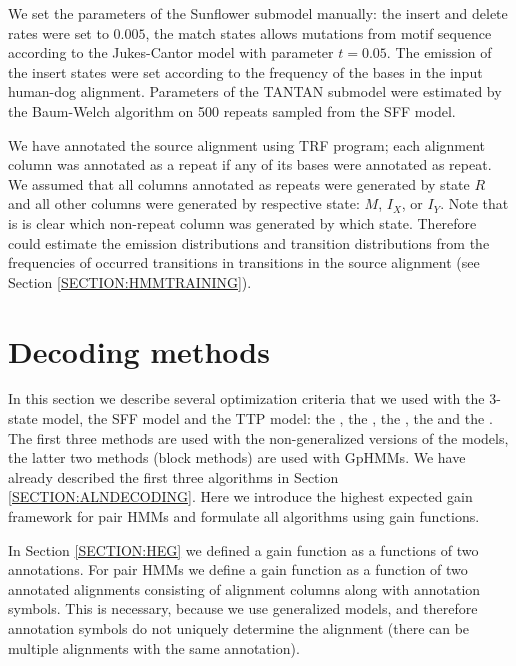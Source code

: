 We set the parameters of the Sunflower submodel manually: the insert and delete
rates were set to $0.005$, the match states allows mutations from motif
sequence according to the Jukes-Cantor model with parameter $t=0.05$. The
emission of the insert states were set according to the frequency of the bases
in the input human-dog alignment.  Parameters of the TANTAN submodel were
estimated by the Baum-Welch algorithm \cite{Durbin1998} on 500 repeats sampled
from the SFF model.

We have annotated the source alignment using TRF program; each alignment column
was annotated as a repeat if any of its bases were annotated as repeat. We
assumed that all columns annotated as repeats were generated by state $R$ and
all other columns were generated by respective state: $M$, $I_X$, or $I_Y$.
Note that is is clear which non-repeat column was generated by which state.
Therefore could estimate the emission distributions and transition
distributions from the frequencies of occurred transitions in transitions in
the source alignment (see Section \ref{SECTION:HMMTRAINING}).

\section{Decoding methods}\label{SECTION:REPDECODING}


In this section we describe several optimization criteria that we used with
the 3-state model, the SFF model and the TTP model: the , the , the
, the  and the .
The first three methods are used with the non-generalized versions of the models, the latter
two methods (block methods) are used with GpHMMs. We
have already described the first three algorithms in Section
\ref{SECTION:ALNDECODING}. Here we introduce the highest expected gain framework
for pair HMMs and formulate all algorithms using gain functions.

In Section \ref{SECTION:HEG} we defined a gain function as a functions of two
annotations. For pair HMMs we define a gain function as a function of two
annotated alignments consisting of alignment columns along with annotation
symbols. This is necessary, because we use generalized models, and therefore
annotation symbols do not uniquely determine the alignment (there can be
multiple alignments with the same annotation).

